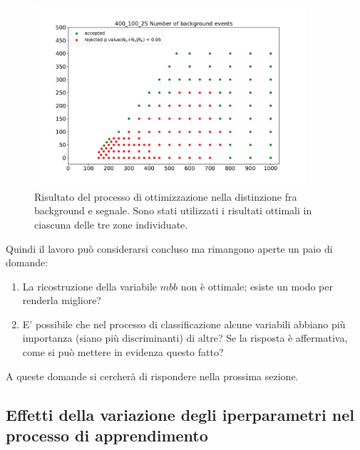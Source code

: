 \begin{figure}[h!]
	\centering
	\includegraphics[width=0.90\textwidth]{figs/risultati_simulazione/mix.pdf}
	\caption{Risultato del processo di ottimizzazione nella distinzione fra background e segnale. Sono stati utilizzati i risultati ottimali in ciascuna delle tre zone individuate.}
	\label{mix}
\end{figure}

Quindi il lavoro può considerarsi concluso ma rimangono aperte un paio di domande:
\begin{enumerate}
	\item La ricostruzione della variabile $\textit{mbb}$ non è ottimale; esiste un modo per renderla migliore?
	\item E' possibile che nel processo di classificazione alcune variabili abbiano più importanza (siano più discriminanti) di altre? Se la risposta è affermativa, come si può mettere in evidenza questo fatto?
\end{enumerate} 
A queste domande si cercherà di rispondere nella prossima sezione.\\

\newpage

\subsection{Effetti della variazione degli iperparametri nel processo di apprendimento}
\label{effetti variazione iperparametri}

